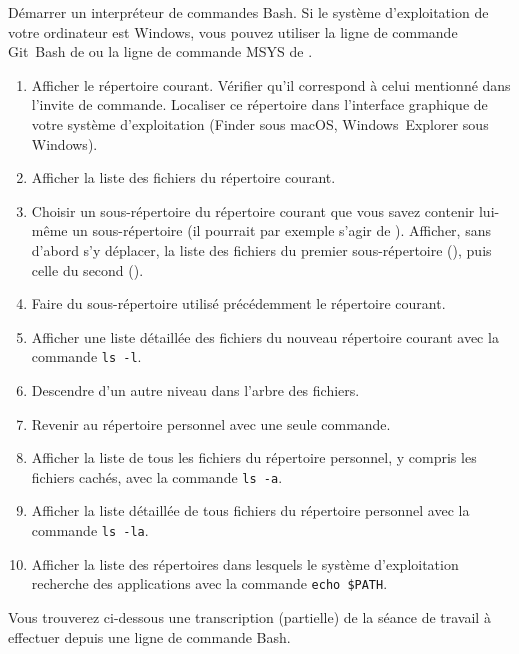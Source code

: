 \begin{exercice}
  Démarrer un interpréteur de commandes Bash. Si le système
  d'exploitation de votre ordinateur est Windows, vous pouvez utiliser
  la ligne de commande Git~Bash de
   ou la
  ligne de commande MSYS de
  .
  \begin{enumerate}
  \item Afficher le répertoire courant. Vérifier qu'il correspond à
    celui mentionné dans l'invite de commande. Localiser ce répertoire
    dans l'interface graphique de votre système d'exploitation (Finder
    sous macOS, Windows~Explorer sous Windows).
  \item Afficher la liste des fichiers du répertoire courant.
  \item Choisir un sous-répertoire du répertoire courant que vous
    savez contenir lui-même un sous-répertoire (il pourrait par
    exemple s'agir de ). Afficher, sans d'abord
    s'y déplacer, la liste des fichiers du premier sous-répertoire
    (), puis celle du second ().
  \item Faire du sous-répertoire utilisé précédemment le répertoire
    courant.
  \item Afficher une liste détaillée des fichiers du nouveau
    répertoire courant avec la commande \verb=ls -l=.
  \item Descendre d'un autre niveau dans l'arbre des fichiers.
  \item Revenir au répertoire personnel avec une seule commande.
  \item Afficher la liste de tous les fichiers du répertoire
    personnel, y compris les fichiers cachés, avec la commande
    \verb=ls -a=.
  \item Afficher la liste détaillée de tous fichiers du répertoire
    personnel avec la commande \verb=ls -la=.
  \item Afficher la liste des répertoires dans lesquels le système
    d'exploitation recherche des applications avec la commande
    \verb=echo $PATH=.
  \end{enumerate}
  \begin{sol}
    Vous trouverez ci-dessous une transcription (partielle) de la
    séance de travail à effectuer depuis une ligne de commande Bash.
    \begin{Schunk}
\begin{Verbatim}[commandchars=\\\{\}]

\end{Verbatim}
\end{Schunk}
\end{sol}
\end{exercice}
